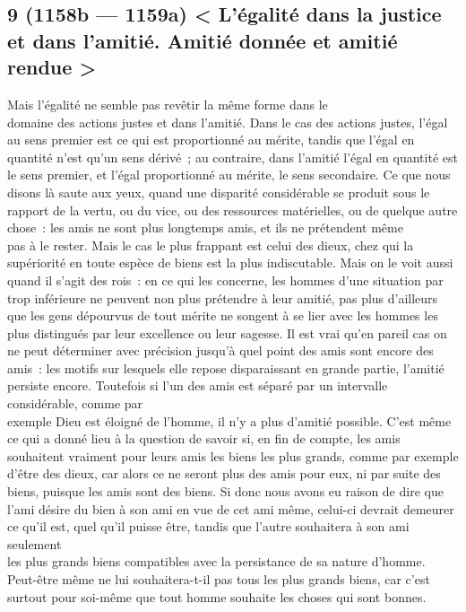 \documentclass[french,twoside]{book} %
\begin{document}
\subsection[{9 (1158b — 1159a) < L’égalité dans la justice et dans l’amitié. Amitié donnée et amitié rendue >}]{9 (1158b — 1159a) < L’égalité dans la justice et dans l’amitié. Amitié donnée et amitié rendue >}
\noindent Mais l’égalité ne semble pas revêtir la même forme dans le \\
domaine des actions justes et dans l’amitié. Dans le cas des actions justes, l’égal au sens premier est ce qui est proportionné au mérite, tandis que l’égal en quantité n’est qu’un sens dérivé ; au contraire, dans l’amitié l’égal en quantité est le sens premier, et l’égal proportionné au mérite, le sens secondaire. Ce que nous disons là saute aux yeux, quand une disparité considérable se produit sous le rapport de la vertu, ou du vice, ou des ressources matérielles, ou de quelque autre chose : les amis ne sont plus longtemps amis, et ils ne prétendent même \\
pas à le rester. Mais le cas le plus frappant est celui des dieux, chez qui la supériorité en toute espèce de biens est la plus  indiscutable. Mais on le voit aussi quand il s’agit des rois : en ce qui les concerne, les hommes d’une situation par trop inférieure ne peuvent non plus prétendre à leur amitié, pas plus d’ailleurs que les gens dépourvus de tout mérite ne songent à se lier avec les hommes les plus distingués par leur excellence ou leur sagesse. Il est vrai qu’en pareil cas on ne peut déterminer avec précision jusqu’à quel point des amis sont encore des amis : les motifs sur lesquels elle repose disparaissant en grande partie, l’amitié persiste encore. Toutefois si l’un des amis est séparé par un intervalle considérable, comme par \\
exemple Dieu est éloigné de l’homme, il n’y a plus d’amitié possible. C’est même ce qui a donné lieu à la question de savoir si, en fin de compte, les amis souhaitent vraiment pour leurs amis les biens les plus grands, comme par exemple d’être des dieux, car alors ce ne seront plus des amis pour eux, ni par suite des biens, puisque les amis sont des biens. Si donc nous avons eu raison de dire que l’ami désire du bien à son ami en vue de cet ami même, celui-ci devrait demeurer ce qu’il est, quel qu’il puisse être, tandis que l’autre souhaitera à son ami seulement \\
les plus grands biens compatibles avec la persistance de sa nature d’homme. Peut-être même ne lui souhaitera-t-il pas tous les plus grands biens, car c’est surtout pour soi-même que tout homme souhaite les choses qui sont bonnes.\par
\end{document}
